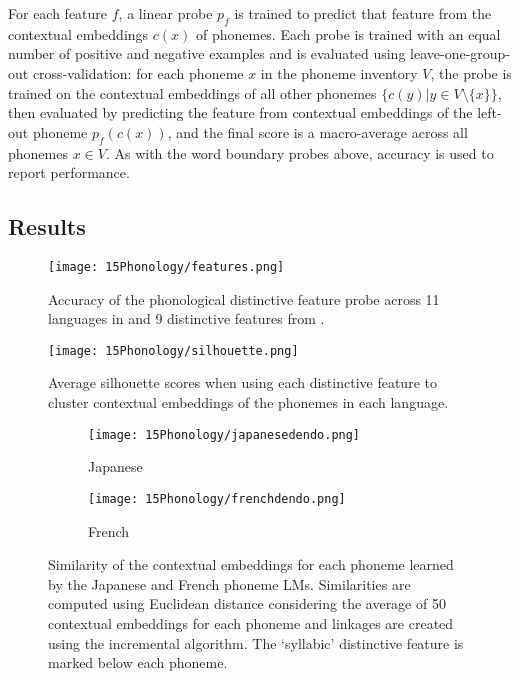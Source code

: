 For each feature $f$, a linear probe $p_f$ is trained to predict that feature from the contextual embeddings $c(x)$ of phonemes. Each probe is trained with an equal number of positive and negative examples and is evaluated using leave-one-group-out cross-validation: for each phoneme $x$ in the phoneme inventory $V$, the probe is trained on the contextual embeddings of all other phonemes $\{c(y) | y\in V \setminus \{x\}\}$, then evaluated by predicting the feature from contextual embeddings of the left-out phoneme $p_f(c(x))$, and the final score is a macro-average across all phonemes $x\in V$. As with the word boundary probes above, accuracy is used to report performance.

\subsection{Results}

\begin{figure}[t]
    \centering
    \texttt{[image: 15Phonology/features.png]}
    \caption{Accuracy of the phonological distinctive feature probe across 11 languages in \ipachildes and 9 distinctive features from \phoible.}
    \label{fig:features}
\end{figure}

\begin{figure}[t]
    \centering
    \texttt{[image: 15Phonology/silhouette.png]}
    \caption{Average silhouette scores when using each distinctive feature to cluster contextual embeddings of the phonemes in each language.}
    \label{fig:silhouette}
\end{figure}

\begin{figure}[t]
    \centering
    \begin{subfigure}{0.49\textwidth}
        \texttt{[image: 15Phonology/japanesedendo.png]}
        \caption{Japanese}
    \end{subfigure}
    \begin{subfigure}{0.49\textwidth}
        \texttt{[image: 15Phonology/frenchdendo.png]}
        \caption{French}
    \end{subfigure}
    \caption{Similarity of the contextual embeddings for each phoneme learned by the Japanese and French phoneme LMs. Similarities are computed using Euclidean distance considering the average of 50 contextual embeddings for each phoneme and linkages are created using the incremental algorithm. The `syllabic' distinctive feature is marked below each phoneme.} 
    \label{fig:dendrogram}
\end{figure}

